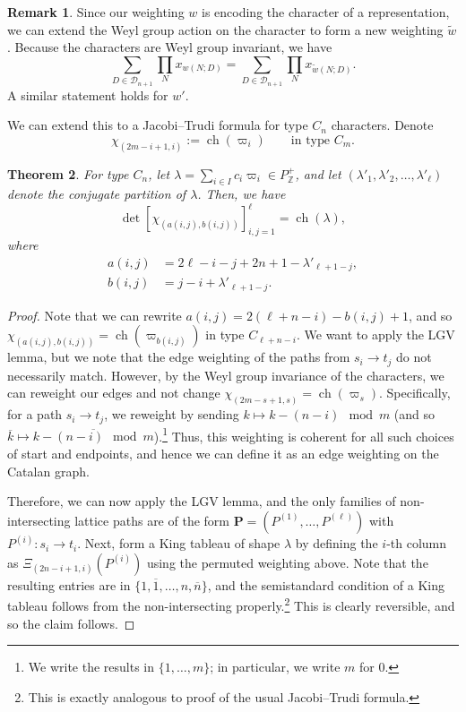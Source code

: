 \documentclass[11pt, leqno]{amsart}
\theoremstyle{plain}
\newtheorem{theorem}{Theorem}[section]
\theoremstyle{definition}
\newtheorem{remark}[theorem]{Remark}
\numberwithin{equation}{section}
\newcommand{\fw}{\varpi} %
\newcommand{\seteq}{\mathbin{:=}}
\newcommand{\Dyck}{\mathcal{D}} %
\newcommand{\nilp}{\mathbf{P}} %
\newcommand{\Z}{\mathbb{Z}}
\newcommand{\ch}{\operatorname{ch}} %
\newcommand{\one}{\overline{1}}
\newcommand{\on}{\overline{n}}
\begin{document}
\begin{remark}
\label{remark:weight_change}
Since our weighting $w$ is encoding the character of a representation, we can extend the Weyl group action on the character to form a new weighting $\widetilde{w}$. Because the characters are Weyl group invariant, we have
\[
\sum_{D \in \Dyck_{n+1}} \prod_N x_{w(N;D)} = \sum_{D \in \Dyck_{n+1}} \prod_N x_{\widetilde{w}(N;D)}.
\]
A similar statement holds for $w'$.
\end{remark}


We can extend this to a Jacobi--Trudi formula for type $C_n$ characters.
Denote
\[
\chi_{(2m-i+1,i)} \seteq \ch(\fw_i) \qquad \text{in type $C_m$}.
\]

\begin{theorem}
\label{thm:general_det_formula_Cn}
For type $C_n$, let $\lambda = \sum_{i \in I} c_i \fw_i \in P_{\Z}^+$, and let $(\lambda'_1, \lambda'_2, \ldots, \lambda'_{\ell})$ denote the conjugate partition of $\lambda$.
Then, we have
\[
\det \left[ \chi_{(a(i,j), b(i,j))} \right]_{i,j=1}^{\ell} =  \ch(\lambda),
\]
where
\begin{align*}
a(i,j) & = 2\ell-i-j+2n+1-\lambda'_{\ell+1-j},
\\ b(i,j) & = j-i+\lambda'_{\ell+1-j}.
\end{align*}
\end{theorem}

\begin{proof}
Note that we can rewrite $a(i,j) = 2(\ell+n-i)-b(i,j)+1$, and so $\chi_{(a(i,j), b(i,j))} = \ch( \fw_{b(i,j)} )$ in type $C_{\ell+n-i}$.
We want to apply the LGV lemma, but we note that the edge weighting of the paths from $s_i \to t_j$ do not necessarily match. However, by the Weyl group invariance of the characters, we can reweight our edges and not change $\chi_{(2m-s+1,s)} = \ch(\fw_s)$. Specifically, for a path $s_i \to t_j$, we reweight by sending $k \mapsto k - (n-i) \mod{m}$ (and so $\overline{k} \mapsto \overline{k - (n-i) \mod{m}}$).\footnote{We write the results in $\{1, \dotsc, m\}$; in particular, we write $m$ for $0$.}
Thus, this weighting is coherent for all such choices of start and endpoints, and hence we can define it as an edge weighting on the Catalan graph.

Therefore, we can now apply the LGV lemma, and the only families of non-intersecting lattice paths are of the form $\nilp = (P^{(1)}, \dotsc, P^{(\ell)})$ with $P^{(i)} \colon s_i \to t_i$. Next, form a King tableau of shape $\lambda$ by defining the $i$-th column as $\Xi_{(2n-i+1,i)}(P^{(i)})$ using the permuted weighting above. Note that the resulting entries are in $\{ 1, \one, \dotsc, n, \on \}$, and the semistandard condition of a King tableau follows from the non-intersecting properly.\footnote{This is exactly analogous to proof of the usual Jacobi--Trudi formula.} This is clearly reversible, and so the claim follows.
\end{proof}
\end{document}
